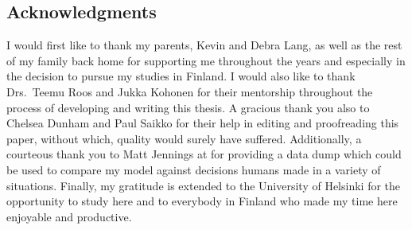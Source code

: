 \vspace*{\fill}
\begin{centering}

\section*{Acknowledgments}
\label{sec:thanks}

\end{centering}


I would first like to thank my parents, Kevin and Debra Lang,
as well as the rest of my family back home
for supporting me
throughout the years and especially in the decision to pursue my studies
in Finland.
%
I would also
like to thank Drs.\ Teemu Roos
and Jukka Kohonen
for %
their mentorship throughout the
process of developing and writing this thesis.
%
A gracious thank you also to Chelsea Dunham and Paul Saikko
for their help in editing and proofreading this paper,
without which,
quality would surely have suffered.
%
Additionally,
a courteous thank you to Matt Jennings at
 for providing a data dump
which could be used to compare my model against decisions humans made
in a variety of situations.
%
Finally, my gratitude is extended to the University of Helsinki for the
opportunity to study here
and to everybody in Finland who made my time here enjoyable and productive.


\vspace*{\fill}
\vspace*{\fill}
\newpage
